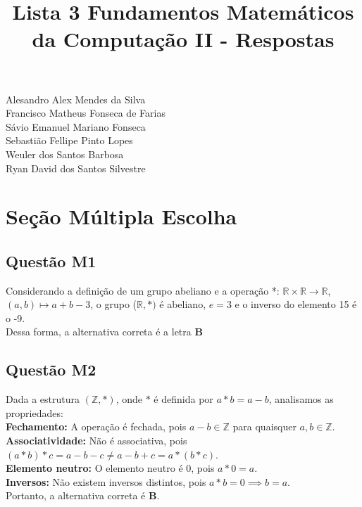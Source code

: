 \documentclass{article}
\title{Lista 3 Fundamentos Matemáticos da Computação II - Respostas}
\begin{document}
\maketitle

\begin{center}
Alesandro Alex Mendes da Silva \\
Francisco Matheus Fonseca de Farias \\
Sávio Emanuel Mariano Fonseca \\
Sebastião Fellipe Pinto Lopes \\
Weuler dos Santos Barbosa \\
Ryan David dos Santos Silvestre \\
\end{center}


\section{Seção Múltipla Escolha}

\subsection{Questão M1} 
Considerando a definição de um grupo abeliano e a operação
*: $\mathbb{R}\times\mathbb{R} \xrightarrow{} \mathbb{R}$, $(a,b) \mapsto a+b-3$, o grupo ($\mathbb{R},*)$ é abeliano, $e=3$ e o inverso do elemento 15 é o -9. \\

Dessa forma, a alternativa correta é a letra \textbf{B}


\subsection{Questão M2}
Dada a estrutura $(\mathbb{Z}, \ast)$, onde $\ast$ é definida por $a \ast b = a - b$, analisamos as propriedades:\\
\textbf{Fechamento:}  
A operação é fechada, pois $a - b \in \mathbb{Z}$ para quaisquer $a, b \in \mathbb{Z}$.\\
\textbf{Associatividade:}  
Não é associativa, pois $(a \ast b) \ast c = a - b - c \neq a - b + c = a \ast (b \ast c)$.\\
\textbf{Elemento neutro:}  
O elemento neutro é $0$, pois $a \ast 0 = a$.\\
\textbf{Inversos:}  
Não existem inversos distintos, pois $a \ast b = 0 \implies b = a$.\\

Portanto, a alternativa correta é \textbf{B}.
\end{document}
